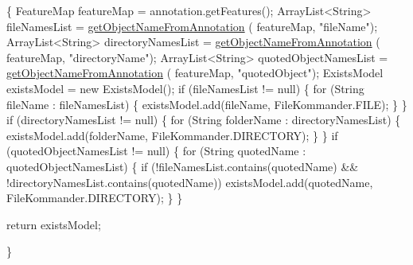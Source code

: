 \begin{DoxyCode}
                                                                               
        \{
        FeatureMap featureMap = annotation.getFeatures();
        ArrayList<String> fileNamesList = \hyperlink{classcom_1_1poly_1_1nlp_1_1filekommander_1_1file_1_1actions_1_1_analyse_action_a8652e1bba48585a8c416e6e212fe4766}{getObjectNameFromAnnotation}
      (
                featureMap, \textcolor{stringliteral}{"fileName"});
        ArrayList<String> directoryNamesList = \hyperlink{classcom_1_1poly_1_1nlp_1_1filekommander_1_1file_1_1actions_1_1_analyse_action_a8652e1bba48585a8c416e6e212fe4766}{getObjectNameFromAnnotation}
      (
                featureMap, \textcolor{stringliteral}{"directoryName"});
        ArrayList<String> quotedObjectNamesList = \hyperlink{classcom_1_1poly_1_1nlp_1_1filekommander_1_1file_1_1actions_1_1_analyse_action_a8652e1bba48585a8c416e6e212fe4766}{getObjectNameFromAnnotation}
      (
                featureMap, \textcolor{stringliteral}{"quotedObject"});
        ExistsModel existsModel = \textcolor{keyword}{new} ExistsModel();
        \textcolor{keywordflow}{if} (fileNamesList != null) \{
            \textcolor{keywordflow}{for} (String fileName : fileNamesList) \{
                existsModel.add(fileName, FileKommander.FILE);
            \}
        \}
        \textcolor{keywordflow}{if} (directoryNamesList != null) \{
            \textcolor{keywordflow}{for} (String folderName : directoryNamesList) \{
                existsModel.add(folderName, FileKommander.DIRECTORY);
            \}
        \}
        \textcolor{keywordflow}{if} (quotedObjectNamesList != null) \{
            \textcolor{keywordflow}{for} (String quotedName : quotedObjectNamesList) \{
                \textcolor{keywordflow}{if} (!fileNamesList.contains(quotedName)
                        && !directoryNamesList.contains(quotedName))
                    existsModel.add(quotedName, FileKommander.DIRECTORY);
            \}
        \}

        \textcolor{keywordflow}{return} existsModel;

    \}
\end{DoxyCode}
